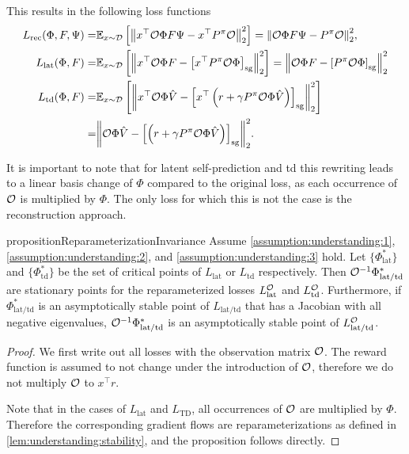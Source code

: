 This results in the following loss functions
\begin{align}
    L_{\text{rec}}(\Phi,F,\Psi) =& \mathbb{E}_{x \sim \mathcal{D}}\left[  \left\lVert x^\top {\mathcal{O}} \Phi F \Psi - x^\top {P^\pi}{\mathcal{O}} \right\rVert_2^2 \right] = {\left\lVert {\mathcal{O}} \Phi F \Psi - {P^\pi}{\mathcal{O}} \right\rVert_2^2}, \\
    L_{\text{lat}}(\Phi,F) =& \mathbb{E}_{x \sim \mathcal{D}}\left[  \left\lVert x^\top {\mathcal{O}} \Phi F - \left[x^\top {P^\pi} {\mathcal{O}} \Phi\right]_{\mathrm{sg}} \right\rVert_2^2 \right] = \left\lVert {\mathcal{O}} \Phi F - \left[{P^\pi} {\mathcal{O}} \Phi\right]_{\mathrm{sg}} \right\rVert_2^2 \\
    L_{\text{td}}(\Phi,F) =& \mathbb{E}_{x \sim \mathcal{D}}\left[  \left\lVert x^\top{\mathcal{O}}\Phi \hat{V} - \left[x^\top \left(r + \gamma P^\pi {\mathcal{O}}\Phi \hat{V}\right)\right]_{\mathrm{sg}} \right\rVert_2^2 \right] \\=& {\left\lVert {\mathcal{O}}\Phi \hat{V} - \left[\left(r + \gamma P^\pi {\mathcal{O}}\Phi \hat{V}\right)\right]_{\mathrm{sg}} \right\rVert_2^2}.
\end{align}


It is important to note that for latent self-prediction and \ac{td} this rewriting leads to a linear basis change of $\Phi$ compared to the original loss, as each occurrence of ${\mathcal{O}}$ is multiplied by $\Phi$. The only loss for which this is not the case is the reconstruction approach.

\begin{restatable}{proposition}{ReparameterizationInvariance} 
Assume \autoref{assumption:understanding:1}, \autoref{assumption:understanding:2}, and \autoref{assumption:understanding:3} hold. Let $\{\Phi^*_\mathrm{lat}\}$ and ${\{\Phi^*_\mathrm{td}\}}$ be the set of critical points of $L_\mathrm{lat}$ or $L_\mathrm{td}$ respectively.
Then ${\mathcal{O}}^{-1}\Phi^*_\mathrm{lat/td}$ are stationary points for the reparameterized losses $L_\mathrm{lat}^{\mathcal{O}}$ and $L_\mathrm{td}^{\mathcal{O}}$. Furthermore, if $\Phi^*_\mathrm{lat/td}$ is an asymptotically stable point of $L_\mathrm{lat/td}$ that has a Jacobian with all negative eigenvalues, ${\mathcal{O}}^{-1}\Phi^*_\mathrm{lat/td}$ is an asymptotically stable point of $L_\mathrm{lat/td}^{\mathcal{O}}$.
\end{restatable}
\begin{proof}
We first write out all losses with the observation matrix ${\mathcal{O}}$. The reward function is assumed to not change under the introduction of ${\mathcal{O}}$, therefore we do not multiply ${\mathcal{O}}$ to $x^\top r$.

Note that in the cases of $L_{\text{lat}}$ and $L_\text{TD}$, all occurrences of ${\mathcal{O}}$ are multiplied by $\Phi$.
Therefore the corresponding gradient flows are reparameterizations as defined in \autoref{lem:understanding:stability}, and the proposition follows directly.
\end{proof}


